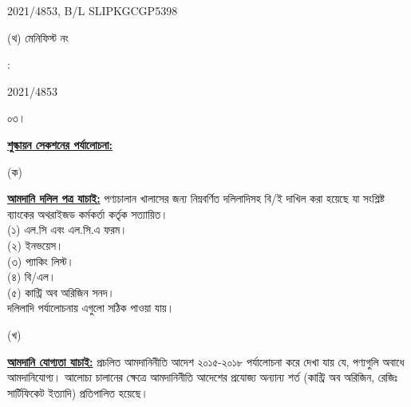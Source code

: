 \documentclass[12pt]{article}
\newcommand{\blno}{SLIPKGCGP5398}
\newcommand{\menifest}{2021/4853}
\begin{document}
\begin{minipage}[t]{0.50\linewidth}
{\menifest}, B/L {\blno}
\\
\end{minipage}
\begin{minipage}[t]{0.05\linewidth}
\hspace*{1em}
\end{minipage}
\begin{minipage}[t]{0.45\linewidth}
(থ) মেনিফিস্ট নং
\end{minipage}
\begin{minipage}[t]{0.02\linewidth}
:
\end{minipage}
\begin{minipage}[t]{0.50\linewidth}
{\menifest}
\\
\end{minipage}
\normalsize
\begin{minipage}[t]{0.05\linewidth}
০৩।
\end{minipage}
\begin{minipage}[t]{0.95\linewidth}
\underline{\textbf{শুল্কায়ন সেকশনের পর্যালোচনা:}}
\end{minipage}
\begin{minipage}[t]{0.05\linewidth}
\hspace{1em}
\end{minipage}
\begin{minipage}[t]{0.05\linewidth}
(ক)
\end{minipage}
\begin{minipage}[t]{0.90\linewidth}
\underline{\textbf{আমদানি দলিল পত্র যাচাই:}}
পণ্যচালান খালাসের জন্য নিম্নবর্ণিত দলিলাদিসহ বি/ই দাখিল করা
হয়েছে যা সংশ্লিষ্ট ব্যাংকের অথরাইজড কর্মকর্তা কর্তৃক সত্যায়িত।
\\
(১) এল.সি এবং এল.সি.এ ফরম।
\\
(২) ইনভয়েস।
\\
(৩) প্যাকিং লিস্ট।
\\
(৪) বি/এল।
\\
(৫) কান্ট্রি অব অরিজিন সনদ।
\\
দলিলাদি পর্যালোচনায় এগুলো
সঠিক পাওয়া যায়।
\\
\end{minipage}
\begin{minipage}[t]{0.05\linewidth}
\hspace{1em}
\end{minipage}
\begin{minipage}[t]{0.05\linewidth}
(খ)
\end{minipage}
\begin{minipage}[t]{0.90\linewidth}
\underline{\textbf{আমদানি যোগ্যতা যাচাই:}}
প্রচলিত আমদানিনীতি আদেশ ২০১৫-২০১৮ পর্যালোচনা করে দেখা যায় যে, পণ্যগুলি অবাধে আমদানিযোগ্য।
আলোচ্য চালানের ক্ষেত্রে আমদানিনীতি আদেশের প্রযোজ্য অন্যান্য শর্ত (কান্ট্রি অব অরিজিন, রেজিঃ
সার্টিফিকেট ইত্যাদি) প্রতিপালিত হয়েছে।
\\
\end{minipage}
\end{document}
